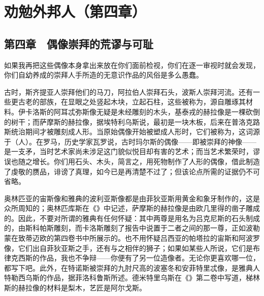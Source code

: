 \par



\section{劝勉外邦人（第四章）}

\par


\subsection{第四章　偶像崇拜的荒谬与可耻}

如果我再把这些偶像本身拿出来放在你们面前检视，你们在逐一审视时就会发现，你们自幼养成的崇拜人手所造的无意识作品的风俗是多么愚蠢。\par

古时，斯齐提亚人崇拜他们的马刀，阿拉伯人崇拜石头，波斯人崇拜河流。还有一些更古老的部族，在显眼之处竖起木块，立起石柱，这些被称为，源自雕琢其材料。伊卡洛斯的阿耳忒弥斯像无疑是未经雕刻的木头，基泰戎的赫拉像是一棵砍倒的树干；而萨摩斯的赫拉像，据埃特利乌斯说，最初是一块木板，后来在普洛克路斯统治期间才被雕刻成人形。当原始偶像开始被塑成人形时，它们被称为，这词源于（人）。在罗马，历史学家瓦罗说，古时玛尔斯的偶像——即被崇拜的神像——是一支矛，当时艺术家尚未涉足这门貌似悦目却有害的艺术；而当艺术繁荣时，谬误也随之增长。你们用石头、木头，简言之，用死物制作了人形的偶像，借此制造了虔敬的赝品，诽谤了真理，如今已是再清楚不过了；但该论点所需的证据仍不可省略。\par

奥林匹亚的宙斯像和雅典的波利亚斯像都是由菲狄亚斯用黄金和象牙制作的，这是众所周知的；奥林匹库斯在《》中记述，萨摩斯的赫拉像是由欧几里得的凿子雕成的。因此，不要对所谓的雅典有任何怀疑：其中两尊是用名为吕克尼斯的石头制成的，由斯科帕斯雕刻，而卡洛斯雕刻了报告中说置于二者之间的那一尊，正如波勒蒙在致蒂迈欧的第四卷书中所展示的。也不用怀疑吕西亚的帕塔拉的宙斯和阿波罗像，它们出自菲狄亚斯之手，还有与之相伴的狮子；如果如某些人所说，它们是布律克西斯的作品，我也不争辩——你便有了另一位造像者。无论你更喜欢哪一位，都写下吧。此外，在特诺斯被崇拜的九肘尺高的波塞冬和安菲特里忒像，是雅典人特勒西乌斯的作品，据菲洛科鲁斯所述。德米特里乌斯在《》第二卷中写道，梯林斯的赫拉像的材料是梨木，艺匠是阿尔戈斯。\par

